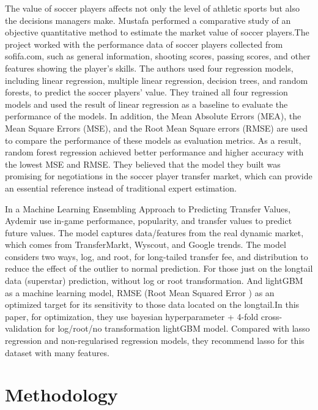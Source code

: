 \documentclass[conference]{IEEEtran}
\begin{document}
The value of soccer players affects not only the level of athletic sports but also the decisions managers make. Mustafa performed a comparative study of an objective quantitative method to estimate the market value of soccer players.\cite{b3}The project worked with the performance data of soccer players collected from sofifa.com, such as general information, shooting scores, passing scores, and other features showing the player's skills. The authors used four regression models, including linear regression, multiple linear regression, decision trees, and random forests, to predict the soccer players' value. They trained all four regression models and used the result of linear regression as a baseline to evaluate the performance of the models. In addition, the Mean Absolute Errors (MEA), the Mean Square Errors (MSE), and the Root Mean Square errors (RMSE) are used to compare the performance of these models as evaluation metrics. As a result, random forest regression achieved better performance and higher accuracy with the lowest MSE and RMSE. They believed that the model they built was promising for negotiations in the soccer player transfer market, which can provide an essential reference instead of traditional expert estimation. \par
In a Machine Learning Ensembling Approach to Predicting Transfer Values, Aydemir use in-game performance, popularity, and transfer values to predict future values.\cite{b4} The model captures data/features from the real dynamic market, which comes from TransferMarkt, Wyscout, and Google trends.	The model considers two ways, log, and root, for long-tailed transfer fee, and distribution to reduce the effect of the outlier to normal prediction. For those just on the longtail data (superstar) prediction, without log or root transformation. And lightGBM as a machine learning model, RMSE (Root Mean Squared Error ) as an optimized target for its sensitivity to those data located on the longtail.In this paper, for optimization, they use bayesian hyperparameter + 4-fold cross-validation for log/root/no transformation lightGBM model. Compared with lasso regression and non-regularised regression models, they recommend lasso for this dataset with many features.



\section{Methodology}
\end{document}
